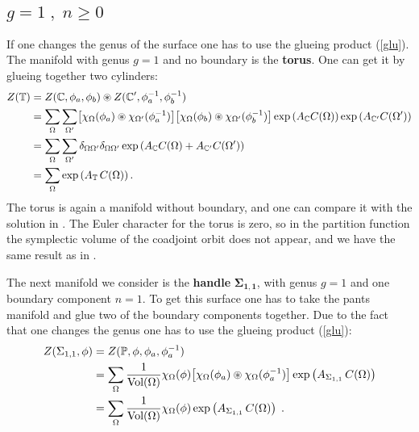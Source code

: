 \documentclass[a4paper,twoside,11pt]{article}
\numberwithin{equation}{section}
\begin{document}
\subsection{$g= 1\;,\;n\geq 0$}
%
If one changes the genus of the surface one has to use the glueing product (\ref{glu}). The manifold with 
genus $g=1$ and no boundary is the {\bf torus}. One can get it by glueing together two cylinders:
\begin{align}
Z(\mathbb{T})&=Z(\mathbb{C},\phi_a,\phi_b)\circledast Z(\mathbb{C}^\prime,\phi^{-1}_a,\phi^{-1}_b)\notag \\
&=\sum\limits_{\Omega}\sum\limits_{\Omega^\prime}
\bigl[\chi_\Omega(\phi_a)\circledast\chi_{\Omega'}(\phi_a^{-1})\bigr]
\bigl[\chi_\Omega(\phi_b)\circledast\chi_{\Omega'}(\phi_b^{-1})\bigr]
\exp\left({A_{\mathbb{C}}C(\Omega)}\right)\exp\left({A_{\mathbb{C^\prime}}C(\Omega^\prime)}\right)\notag\\
&=\sum\limits_{\Omega}\sum\limits_{\Omega^\prime}\delta_{\Omega\Omega^\prime}\delta_{\Omega\Omega^\prime}
\exp\left( A_{\mathbb{C}}C(\Omega)+A_{\mathbb{C}^\prime}C(\Omega^\prime)\right)\notag\\
&= \sum\limits_\Omega \exp\left( A_{\mathbb{T}}\,C(\Omega)\right).\label{torus}
\end{align}
The torus is again a manifold without boundary, and one can compare it with the solution in \cite{HS}. 
The Euler character for the torus is zero, so in the partition function  the symplectic volume of the coadjoint orbit
does not appear, and we have the same result as in  \cite{HS}.

The next manifold we consider is the {\bf handle} $\mathbf{\Sigma_{1,1}}$, with genus $g=1$ and 
one boundary component $n=1$. To get this surface one has to take the pants manifold and glue two of the boundary 
components together. Due to the fact that one changes the genus one has to use the glueing product 
(\ref{glu}):
\begin{align}
Z(\Sigma_{1,1},\phi)&=Z(\mathbb{P},\phi,\phi_a,\phi^{-1}_a)\notag\\
 &=\sum_\Omega \frac{1}{\text{Vol}(\Omega)}\chi_\Omega(\phi)\bigl[\chi_\Omega(\phi_a)\circledast
\chi_\Omega(\phi_a^{-1})\bigr]\exp\left(A_{\Sigma_{1,1}}\,C(\Omega)\right)\notag\\
& =\sum_\Omega\frac{1}{\text{Vol}(\Omega)}\chi_\Omega(\phi)\exp\left(A_{\Sigma_{1,1}}\,C(\Omega)\right)
\label{g1n1}\;.
\end{align}
\end{document}
